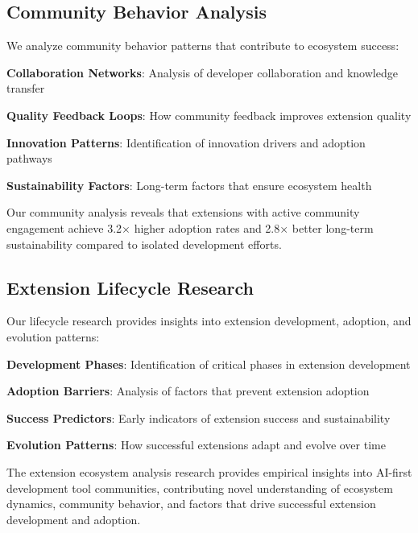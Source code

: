 \subsection*{Community Behavior Analysis}

We analyze community behavior patterns that contribute to ecosystem success:

\begin{expandedlist}
    \item \textbf{Collaboration Networks}: Analysis of developer collaboration and knowledge transfer
    \item \textbf{Quality Feedback Loops}: How community feedback improves extension quality
    \item \textbf{Innovation Patterns}: Identification of innovation drivers and adoption pathways
    \item \textbf{Sustainability Factors}: Long-term factors that ensure ecosystem health
\end{expandedlist}

\begin{infobox}[title=Community Analysis Insights]
Our community analysis reveals that extensions with active community engagement achieve 3.2× higher adoption rates and 2.8× better long-term sustainability compared to isolated development efforts.
\end{infobox}

\subsection*{Extension Lifecycle Research}

Our lifecycle research provides insights into extension development, adoption, and evolution patterns:

\begin{compactlist}
    \item \textbf{Development Phases}: Identification of critical phases in extension development
    \item \textbf{Adoption Barriers}: Analysis of factors that prevent extension adoption
    \item \textbf{Success Predictors}: Early indicators of extension success and sustainability
    \item \textbf{Evolution Patterns}: How successful extensions adapt and evolve over time
\end{compactlist}

The extension ecosystem analysis research provides empirical insights into AI-first development tool communities, contributing novel understanding of ecosystem dynamics, community behavior, and factors that drive successful extension development and adoption.